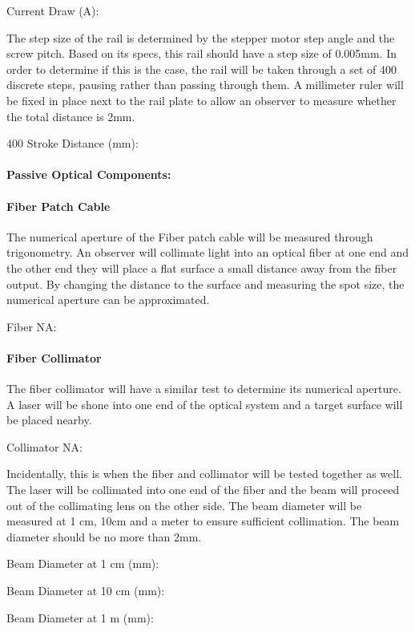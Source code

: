 Current Draw (A):
\bigskip

The step size of the rail is determined by the stepper motor step angle and the screw pitch. Based on its specs, this rail should have a step size of 0.005mm. In order to determine if this is the case, the rail will be taken through a set of 400 discrete steps, pausing rather than passing through them. A millimeter ruler will be fixed in place next to the rail plate to allow an observer to measure whether the total distance is 2mm.
\bigskip

400 Stroke Distance (mm):
\bigskip

\paragraph{Passive Optical Components:}

\paragraph{Fiber Patch Cable} The numerical aperture of the Fiber patch cable will be measured through trigonometry. An observer will collimate light into an optical fiber at one end and the other end they will place a flat surface a small distance away from the fiber output. By changing the distance to the surface and measuring the spot size, the numerical aperture can be approximated.
\bigskip

Fiber NA:
\bigskip

\paragraph{Fiber Collimator} The fiber collimator will have a similar test to determine its numerical aperture. A laser will be shone into one end of the optical system and a target surface will be placed nearby.
\bigskip

Collimator NA:
\bigskip

Incidentally, this is when the fiber and collimator will be tested together as well. The laser will be collimated into one end of the fiber and the beam will proceed out of the collimating lens on the other side. The beam diameter will be measured at 1 cm, 10cm and a meter to ensure sufficient collimation. The beam diameter should be no more than 2mm.
\bigskip

Beam Diameter at 1 cm (mm):	

Beam Diameter at 10 cm (mm):	

Beam Diameter at 1 m (mm):	

